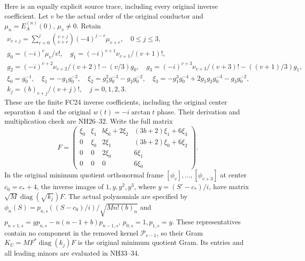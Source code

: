 \documentclass[11pt]{article}
\newcommand{\diag}{\operatorname{diag}}
\begin{document}
Here is an equally explicit source trace, including every
original inverse coefficient. Let $v$ be the actual order
of the original conductor and $\mu_n=E_A^{(n)}(0)$,
$\mu_v\ne0$. Retain
\[
\begin{gathered}
 \nu_{v+j}=\sum_{r=0}^j\binom{v+j}{v+r}(-4)^{j-r}\mu_{v+r},
 \quad0\le j\le3,\\
 g_0=(-i)^v\mu_v/v!,\quad
 g_1=(-i)^{v+1}\nu_{v+1}/(v+1)!,\\
 g_2=(-i)^{v+2}\nu_{v+2}/(v+2)!-(v/3)g_0,\quad
 g_3=(-i)^{v+3}\nu_{v+3}/(v+3)!-((v+1)/3)g_1,\\
 \xi_0=g_0^{-1},\quad \xi_1=-g_1g_0^{-2},\quad
 \xi_2=g_1^2g_0^{-3}-g_2g_0^{-2},\quad
 \xi_3=-g_1^3g_0^{-4}+2g_1g_2g_0^{-3}-g_3g_0^{-2},\\
 k_j=(b)_{v+j}/(v+j)!,\quad j=0,1,2,3.
\end{gathered}\tag{NW13}
\]
These are the finite FC24 inverse coefficients, including
the original center separation $4$ and the original
$w(t)=-i\arctan t$ phase. Their derivation and multiplication
check are NH26--32. Write the full matrix
\[
 F=\begin{pmatrix}
 \xi_0&\xi_1&b\xi_0+2\xi_2&(3b+2)\xi_1+6\xi_3\\
 0&\xi_0&2\xi_1&(3b+2)\xi_0+6\xi_2\\
 0&0&2\xi_0&6\xi_1\\0&0&0&6\xi_0
 \end{pmatrix}.
 \tag{NW14}
\]
In the original minimum quotient orthonormal frame
$[\phi_v],\ldots,[\phi_{v+3}]$ at center $c_0=c_*+4$,
the inverse images of $1,y,y^2,y^3$, where
$y=(S'-c_*)/i$, have matrix
$\sqrt M\diag(\sqrt{k_j})F$. The actual polynomials are
specified by
$\phi_n(S)=p_{n,s}((S-c_0)/i)/\sqrt{Mn!(b)_n}$ and
$p_{n+1,s}=yp_{n,s}-n(n-1+b)p_{n-1,s}$,
$p_{0,s}=1,p_{1,s}=y$. These representatives contain no
component in the removed kernel $\mathcal P_{v-1}$, so
their Gram $K_U=MF^*\diag(k_j)F$ is the original minimum
quotient Gram. Its entries and all leading minors are
evaluated in NH33--34.
\end{document}
